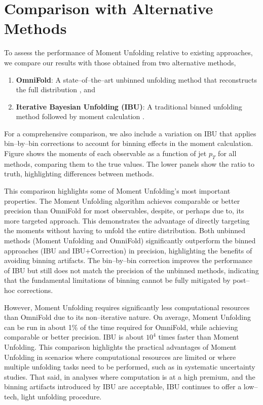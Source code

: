 \section{Comparison with Alternative Methods}
    To assess the performance of Moment Unfolding relative to existing approaches, we compare our results with those obtained from two alternative methods,
    \begin{enumerate}
        \item \textbf{OmniFold}: A state--of--the--art unbinned unfolding method that reconstructs the full distribution , and 
        \item \textbf{Iterative Bayesian Unfolding (IBU)}: A traditional binned unfolding method followed by moment calculation .
    \end{enumerate}
    For a comprehensive comparison, we also include a variation on IBU that applies bin--by--bin corrections to account for binning effects in the moment calculation.
    Figure  shows the moments of each observable as a function of jet $p_T$ for all methods, comparing them to the true values.
    The lower panels show the ratio to truth, highlighting differences between methods.

    This comparison highlights some of Moment Unfolding's most important properties.
    The Moment Unfolding algorithm achieves comparable or better precision than OmniFold for most observables, despite, or perhaps due to, its more targeted approach.
    This demonstrates the advantage of directly targeting the moments without having to unfold the entire distribution.
    Both unbinned methods (Moment Unfolding and OmniFold) significantly outperform the binned approaches (IBU and IBU+Correction) in precision, highlighting the benefits of avoiding binning artifacts.
    The bin--by--bin correction improves the performance of IBU but still does not match the precision of the unbinned methods, indicating that the fundamental limitations of binning cannot be fully mitigated by post--hoc corrections.
    
    However, Moment Unfolding requires significantly less computational resources than OmniFold due to its non--iterative nature.
    On average, Moment Unfolding can be run in about 1\% of the time required for OmniFold, while achieving comparable or better precision.
    IBU is about \(10^4\) times faster than Moment Unfolding.
    This comparison highlights the practical advantages of Moment Unfolding in scenarios where computational resources are limited or where multiple unfolding tasks need to be performed, such as in systematic uncertainty studies.
    That said, in analyses where computation is at a high premium, and the binning artifacts introduced by IBU are acceptable, IBU continues to offer a low--tech, light unfolding procedure.

